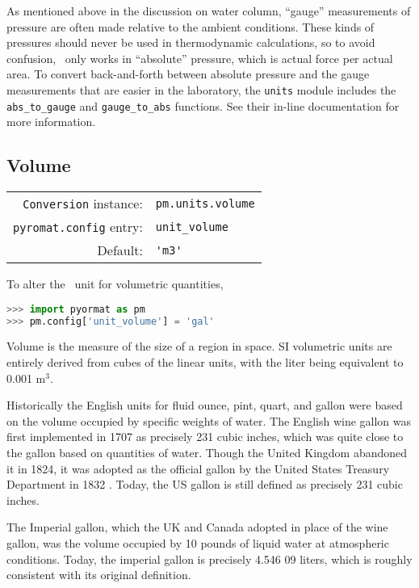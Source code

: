 As mentioned above in the discussion on water column, ``gauge'' measurements of pressure are often made relative to the ambient conditions.  These kinds of pressures should never be used in thermodynamic calculations, so to avoid confusion, \PM\ only works in ``absolute'' pressure, which is actual force per actual area.  To convert back-and-forth between absolute pressure and the gauge measurements that are easier in the laboratory, the \texttt{units} module includes the \verb|abs_to_gauge| and \verb|gauge_to_abs| functions.  See their in-line documentation for more information.

%
%

\subsection{Volume}\label{sec:units:volume}

\begin{tabular}{rl}
\hline
\verb|Conversion| instance: & \verb|pm.units.volume|\\
\verb|pyromat.config| entry: & \verb|unit_volume|\\
Default: & \verb|'m3'|\\
\hline
\end{tabular}
\vspace{1em}

To alter the \PM\ unit for volumetric quantities,
\begin{lstlisting}[language=Python]
>>> import pyormat as pm
>>> pm.config['unit_volume'] = 'gal'
\end{lstlisting}

Volume is the measure of the size of a region in space.  SI volumetric units are entirely derived from cubes of the linear units, with the liter being equivalent to 0.001 m$^3$.

Historically the English units for fluid ounce, pint, quart, and gallon were based on the volume occupied by specific weights of water.  The English wine gallon was first implemented in 1707 as precisely 231 cubic inches, which was quite close to the gallon based on quantities of water.  Though the United Kingdom abandoned it in 1824, it was adopted as the official gallon by the United States Treasury Department in 1832 \cite[p.]{nbs:sp447}.  Today, the US gallon is still defined as precisely 231 cubic inches.

The Imperial gallon, which the UK and Canada adopted in place of the wine gallon, was the volume occupied by 10 pounds of liquid water at atmospheric conditions.  Today, the imperial gallon is precisely 4.546 09 liters, which is roughly consistent with its original definition.

